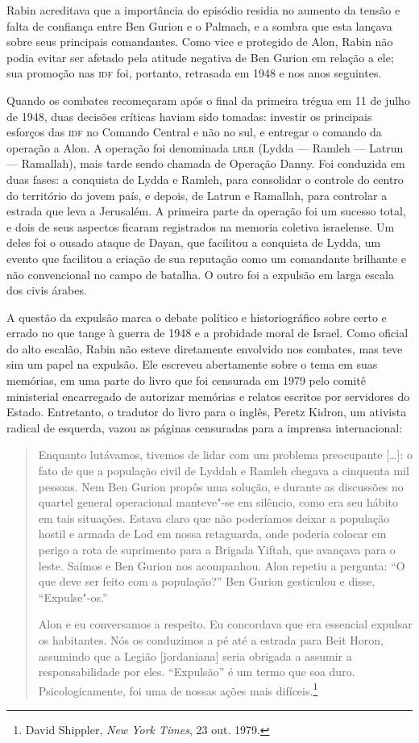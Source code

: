 Rabin acreditava que a importância do episódio residia no aumento da
tensão e falta de confiança entre Ben Gurion e o Palmach, e a sombra que
esta lançava sobre seus principais comandantes. Como vice e protegido de
Alon, Rabin não podia evitar ser afetado pela atitude negativa de Ben
Gurion em relação a ele; sua promoção nas \textsc{idf} foi, portanto, retrasada
em 1948 e nos anos seguintes.

Quando os combates recomeçaram após o final da primeira trégua em 11 de
julho de 1948, duas decisões críticas haviam sido tomadas: investir os
principais esforços das \textsc{idf} no Comando Central e não no sul, e entregar
o comando da operação a Alon. A operação foi denominada \textsc{lrlr} (Lydda ---
Ramleh --- Latrun --- Ramallah), mais tarde sendo chamada de Operação
Danny. Foi conduzida em duas fases: a conquista de Lydda e Ramleh, para
consolidar o controle do centro do território do jovem país, e depois,
de Latrun e Ramallah, para controlar a estrada que leva a Jerusalém. A
primeira parte da operação foi um sucesso total, e dois de seus aspectos
ficaram registrados na memoria coletiva israelense. Um deles foi o
ousado ataque de Dayan, que facilitou a conquista de Lydda, um evento
que facilitou a criação de sua reputação como um comandante brilhante e
não convencional no campo de batalha. O outro foi a expulsão em larga
escala dos civis árabes.

A questão da expulsão marca o debate político e historiográfico
sobre certo e errado no que tange à guerra de 1948 e a probidade
moral de Israel. Como oficial do alto escalão, Rabin não esteve
diretamente envolvido nos combates, mas teve sim um papel na expulsão.
Ele escreveu abertamente sobre o tema em suas memórias, em uma parte do
livro que foi censurada em 1979 pelo comitê ministerial encarregado de
autorizar memórias e relatos escritos por servidores do Estado.
Entretanto, o tradutor do livro para o inglês, Peretz Kidron, um
ativista radical de esquerda, vazou as páginas censuradas para a
imprensa internacional:

\begin{quote}
Enquanto lutávamos, tivemos de lidar com um problema preocupante {[}\ldots{}{]}: o
fato de que a população civil de Lyddah e Ramleh chegava a cinquenta mil
pessoas. Nem Ben Gurion propôs uma solução, e durante as discussões no
quartel general operacional manteve"-se em silêncio, como era seu hábito
em tais situações. Estava claro que não poderíamos deixar a população
hostil e armada de Lod em nossa retaguarda, onde poderia colocar em
perigo a rota de suprimento para a Brigada Yiftah, que avançava para o
leste. Saímos e Ben Gurion nos acompanhou. Alon repetiu a pergunta: ``O
que deve ser feito com a população?'' Ben Gurion gesticulou e disse, %
``Expulse"-os.''

Alon e eu conversamos a respeito. Eu concordava que era essencial
expulsar os habitantes. Nós os conduzimos a pé até a estrada para Beit
Horon, assumindo que a Legião {[}jordaniana{]} seria obrigada a assumir a
responsabilidade por eles. ``Expulsão'' é um termo que soa duro.
Psicologicamente, foi uma de nossas ações mais difíceis.\footnote{David Shippler, \emph{New York Times}, 23 out. 1979.}
\end{quote}

